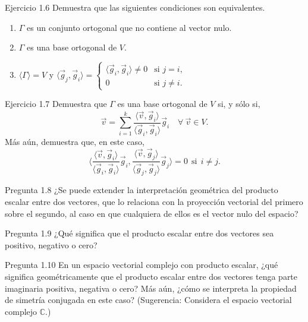\documentclass[12pt,dvipsnames]{article}
\numberwithin{equation}{section}
\begin{document}
Ejercicio 1.6 Demuestra que las siguientes condiciones son equivalentes. 

\begin{enumerate}[label=(\alph*)]
    \item $\Gamma$ es un conjunto ortogonal que no contiene al vector nulo.

    \item $\Gamma$ es una base ortogonal de $V$.

    \item $\langle \Gamma \rangle = V$ y $\langle \vec{g}_j , \vec{g}_i \rangle = \begin{cases} \langle \vec{g}_i , \vec{g}_i \rangle \neq 0 &\text{si } j=i, \\ 0 &\text{si } j \neq i. \end{cases}$
\end{enumerate} 

Ejercicio 1.7 Demuestra que $\Gamma$ es una base ortogonal de $V$ si, y sólo si, 
\[
    \vec{v} = \sum_{i=1}^k \frac{\langle \vec{v} , \vec{g}_i \rangle}{\langle \vec{g}_i , \vec{g}_i \rangle} \vec{g}_i \quad \forall \ \vec{v}\in V.
\]
\noindent Más aún, demuestra que, en este caso,
\[
\bigg\langle \frac{\langle \vec{v} , \vec{g}_i \rangle}{\langle \vec{g}_i , \vec{g}_i \rangle} \vec{g}_i, \frac{\langle \vec{v} , \vec{g}_j \rangle}{\langle \vec{g}_j , \vec{g}_j \rangle} \vec{g}_j \bigg \rangle = 0 \ \ \text{si} \ \ i\neq j.
\] 

Pregunta 1.8 ¿Se puede extender la interpretación geométrica del producto escalar entre dos vectores, que lo relaciona con la proyección vectorial del primero sobre el segundo, al caso en que cualquiera de ellos es el vector nulo del espacio?

Pregunta 1.9 ¿Qué significa que el producto escalar entre dos vectores sea positivo, negativo o cero? 

Pregunta 1.10 En un espacio vectorial complejo con producto escalar, ¿qué significa geométricamente que el producto escalar entre dos vectores tenga parte imaginaria positiva, negativa o cero? Más aún, ¿cómo se interpreta la propiedad de simetría conjugada en este caso? (Sugerencia: Considera el espacio vectorial complejo $\mathbb{C}$.) \\ 
\end{document}
